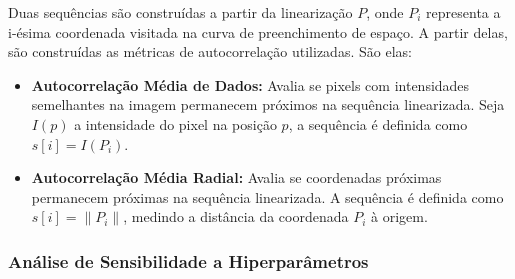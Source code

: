 \documentclass[12pt]{article}
\begin{document}
Duas sequências são construídas a partir da linearização $P$, onde $P_i$ representa a i-ésima coordenada visitada
na curva de preenchimento de espaço. A partir delas, são construídas as métricas de autocorrelação utilizadas. São elas:

\begin{itemize}
 \item \textbf{Autocorrelação Média de Dados:} Avalia se pixels com intensidades semelhantes na imagem permanecem próximos na sequência linearizada.
 Seja $I(p)$ a intensidade do pixel na posição $p$, a sequência é definida como $s[i] = I(P_i)$.
 \item \textbf{Autocorrelação Média Radial:} Avalia se coordenadas próximas permanecem próximas na sequência linearizada.
 A sequência é definida como $s[i] = \|P_i\|$, medindo a distância da coordenada $P_i$ à origem.
\end{itemize}

\subsubsection{Análise de Sensibilidade a Hiperparâmetros}
\end{document}
